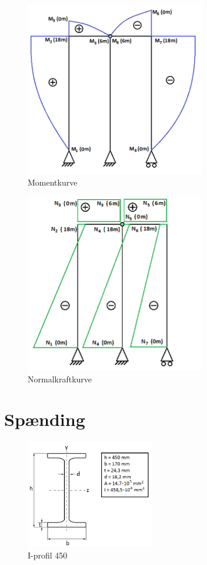 \begin{figure}[H]
	\centering
	\includegraphics[width=0.7\textwidth]{billeder/skkm.png}
	\caption{Momentkurve}
	\label{fig:momentkurve}
\end{figure}

\begin{figure}[H]
	\centering
	\includegraphics[width=0.7\textwidth]{billeder/SKFN.png}
	\caption{Normalkraftkurve}
	\label{fig:normalkraftkurve}
\end{figure}

\section{Spænding}

\begin{figure}[H]
	\centering
	\includegraphics[width=0.5\textwidth]{billeder/iprofil.png}
	\caption{I-profil 450}
	\label{fig:iprofil}
\end{figure}

